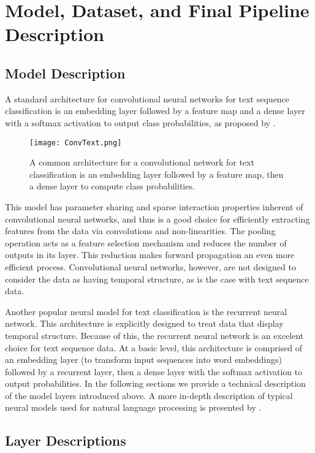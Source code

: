
\chapter{Model, Dataset, and Final Pipeline Description}
\section{Model Description}
A standard architecture for convolutional neural networks for text sequence classification is an embedding layer
followed by a feature map and a dense layer with a softmax activation to output class probabilities, as proposed by \cite{kim2014convolutional}.
\begin{figure}[H]
\centering
\texttt{[image: ConvText.png]}
\caption{A common architecture for a convolutional network for text classification is an embedding layer followed by a feature map, then a
dense layer to compute class probabilities.}
\end{figure}
This model has parameter sharing and sparse interaction properties inherent of convolutional
neural networks, and thus is a good choice for efficiently extracting features from the data via convolutions and non-linearities.
The pooling operation acts as a feature selection mechanism and reduces the number of outputs in its layer. This reduction makes forward propagation
an even more efficient process. Convolutional neural networks, however, are not designed to consider the data as having temporal
structure, as is the case with text sequence data.


Another popular neural model for text classification is the recurrent neural network. This architecture is explicitly designed to treat
data that display temporal structure. Because of this, the recurrent neural network is an excelent choice for text sequence data.
At a basic level, this architecture is comprised of an embedding layer (to transform input sequences into word embeddings)
followed by a recurrent layer, then a dense layer with the softmax activation to output probabilities.
In the following sections we provide a technical description of the model layers introduced above.
A more in-depth description of typical neural models used for natural language processing is presented by \cite{yin2017comparative}.
\section{Layer Descriptions}

